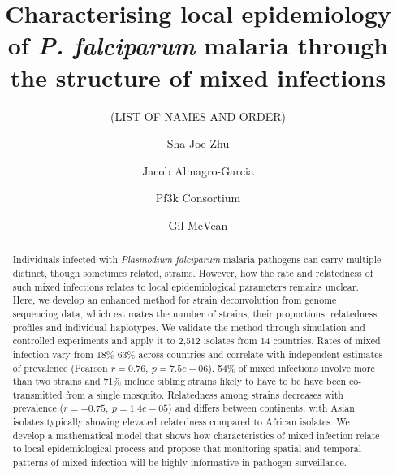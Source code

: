 \documentclass[9pt,lineno]{elife}
\newcounter{todocounter}
\newcommand{\done}[2][]
{\todo[color=green!40, #1]{#2}}
\newcommand{\donenum}[2][]
{\stepcounter{todocounter}\done[#1]{\thetodocounter: #2}}
\begin{document}
\title{Characterising local epidemiology of {\it P. falciparum} malaria through the structure of mixed infections}
\newcommand\shorttitle{Mixed infections in malaria}
\date{}

\author[?]{(LIST OF NAMES AND ORDER)}
\author[1]{Sha Joe Zhu}
\author[1,2,3,4]{Jacob Almagro-Garcia}
\author[?]{Pf3k Consortium}
\author[1,3]{Gil McVean}



\maketitle{}

\begin{abstract}
Individuals infected with {\it Plasmodium falciparum} malaria pathogens can carry multiple distinct, though sometimes related, strains.  However, how the rate and relatedness of such mixed infections relates to local epidemiological parameters remains unclear.  Here, we develop an enhanced method for strain deconvolution from genome sequencing data, which estimates the number of strains, their proportions, relatedness profiles and individual haplotypes.  We validate the method through simulation and controlled experiments and apply it to 2,512 isolates from 14 countries.  Rates of mixed infection vary from 18\%-63\% across countries and correlate with independent estimates of prevalence (Pearson $r = 0.76,~p = 7.5e-06$).  54\% of mixed infections involve more than two strains and 71\% include sibling strains likely to have to be have been co-transmitted from a single mosquito.  Relatedness among strains decreases with prevalence ($r = -0.75,~p = 1.4e-05$) and differs between continents, with Asian isolates typically showing elevated relatedness compared to African isolates.  We develop a mathematical model that shows how characteristics of mixed infection relate to local epidemiological process and propose that monitoring spatial and temporal patterns of mixed infection will be highly informative in pathogen surveillance.
\end{abstract}
\end{document}
